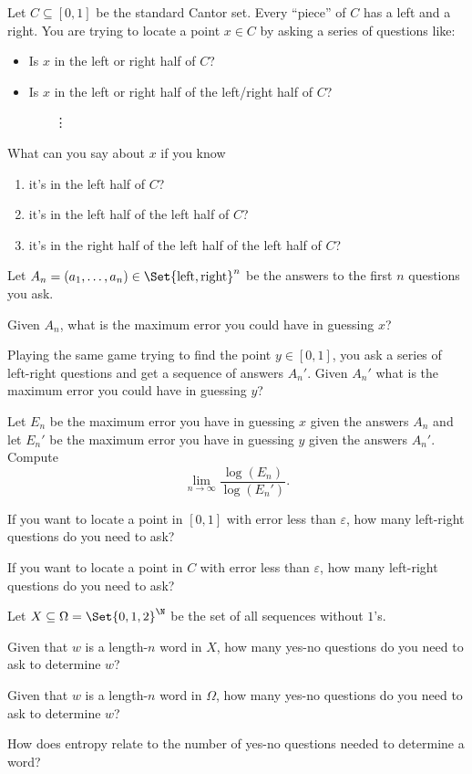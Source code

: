 	\question
	Let $C\subseteq[0,1]$ be the standard Cantor set. Every ``piece'' of $C$ has a left and a right. You are trying to locate a 
	point $x\in C$ by asking a series of questions like:
	\begin{itemize}
		\item Is $x$ in the left or right half of $C$?
		\item Is $x$ in the left or right half of the left/right half of $C$?

			~~~~\vdots
	\end{itemize}
	\begin{parts}
		\item What can you say about $x$ if you know
			\begin{enumerate}
				\item it's in the left half of $C$?
				\item it's in the left half of the left half of $C$?
				\item it's in the right half of the left half of the left half of $C$?
			\end{enumerate}
		\item Let $A_n=(a_1,\ldots, a_n)\in\Set{\text{left},\text{right}}^n$ be the answers to the first $n$ questions
			you ask.

			Given $A_n$, what is the maximum error you could have in guessing $x$?
		\item Playing the same game trying to find the point  $y\in [0,1]$, you ask a series of left-right questions and
			get a sequence of answers $A_n'$. Given $A_n'$ what is the maximum error you could have in guessing $y$?
		\item Let $E_n$ be the maximum error you have in guessing $x$ given the answers $A_n$
			and let $E_n'$ be the maximum error you have in guessing $y$ given the answers $A_n'$.
			Compute
			\[
				\lim_{n\to\infty} \frac{\log(E_n)}{\log(E_n')}.
			\]
		\item If you want to locate a point in $[0,1]$ with error less than $\varepsilon$, how many left-right
			questions do you need to ask?
		\item If you want to locate a point in $C$ with error less than $\varepsilon$, how many left-right
			questions do you need to ask?

	\end{parts}


	\newpage
	\question
	Let $X\subseteq \Omega=\Set{0,1,2}^\N$ be the set of all sequences without $1$'s.
	\begin{parts}
		\item Given that $w$ is a length-$n$ word in $X$, how many yes-no questions do you need
			to ask to determine $w$?
		\item Given that $w$ is a length-$n$ word in $\Omega$, how many yes-no questions do you need
			to ask to determine $w$?
		\item How does entropy relate to the number of yes-no questions needed to determine a word?
	\end{parts}


